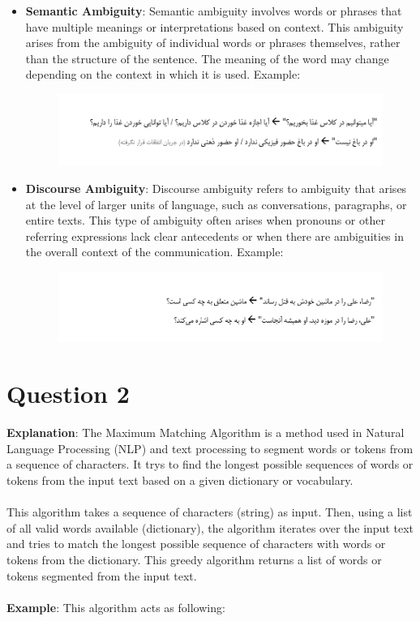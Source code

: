 \documentclass{article}
\begin{document}
\begin{itemize}
    \item \textbf{Semantic Ambiguity}: Semantic ambiguity involves words or phrases that have multiple meanings or interpretations based on context. This ambiguity arises from the ambiguity of individual words or phrases themselves, rather than the structure of the sentence. The meaning of the word may change depending on the context in which it is used. Example:
        \begin{figure}[h]
          \centering
          \includegraphics[width=1\textwidth]{Images/Semantic.png}
          \label{fig:model_diagram}
        \end{figure}

    \item \textbf{Discourse Ambiguity}: Discourse ambiguity refers to ambiguity that arises at the level of larger units of language, such as conversations, paragraphs, or entire texts. This type of ambiguity often arises when pronouns or other referring expressions lack clear antecedents or when there are ambiguities in the overall context of the communication. Example:
        \begin{figure}[h]
          \centering
          \includegraphics[width=1\textwidth]{Images/Discourse.png}
          \label{fig:model_diagram}
        \end{figure}

\end{itemize}
\pagebreak

\section{Question 2}
\textbf{Explanation}: The Maximum Matching Algorithm is a method used in Natural Language Processing (NLP) and text processing to segment words or tokens from a sequence of characters. It trys to find the longest possible sequences of words or tokens from the input text based on a given dictionary or vocabulary.\\\\
This algorithm takes a sequence of characters (string) as input. Then, using a list of all valid words available (dictionary), the algorithm iterates over the input text and tries to match the longest possible sequence of characters with words or tokens from the dictionary. This greedy algorithm returns a list of words or tokens segmented from the input text.\\\\
\textbf{Example}: This algorithm acts as following:
\end{document}
